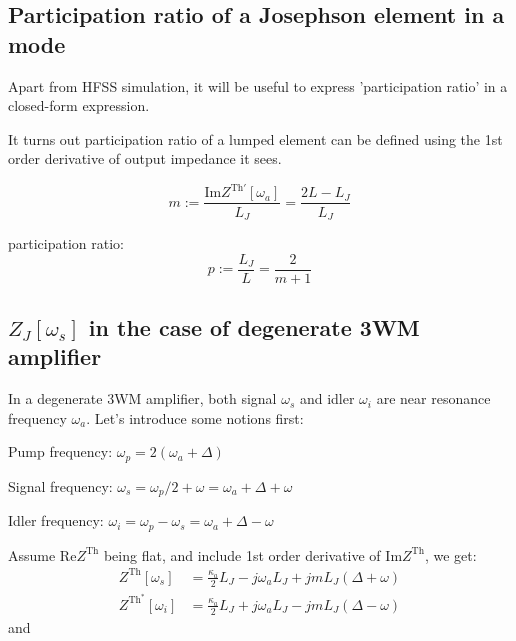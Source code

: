 \documentclass{article}
\renewcommand{\Re}{\mathrm{Re}}
\renewcommand{\Im}{\mathrm{Im}}
\newcommand{\Th}{\mathrm{Th}}
\begin{document}
\subsection{Participation ratio of a Josephson element in a mode}


Apart from HFSS simulation, it will be useful to express 'participation ratio' in a closed-form expression. 

It turns out participation ratio of a lumped element can be defined using the 1st order derivative of output impedance it sees. 

\begin{equation}\label{eq:m}
m:= \frac{\Im Z^{\Th'}[\omega_a]}{L_J} = \frac{2L - L_J}{L_J}
\end{equation}

participation ratio: 
\begin{equation}
p:= \frac{L_J}{L} = \frac{2}{m + 1}
\end{equation}


\subsection{$Z_J[\omega_s]$ in the case of degenerate 3WM amplifier}
In a degenerate 3WM amplifier, both signal $\omega_s$ and idler $\omega_i$ are near resonance frequency $\omega_a$. Let's introduce some notions first:

Pump frequency: $\omega_p = 2 (\omega_a + \Delta)$

Signal frequency: $\omega_s = \omega_p/2 + \omega = \omega_a + \Delta + \omega$

Idler frequency: $\omega_i = \omega_p - \omega_s = \omega_a + \Delta - \omega$

Assume $\Re{Z^\Th}$ being flat, and include 1st order derivative of $\Im{Z^\Th}$, we get:
\begin{equation}\label{eq:ZE}
\begin{aligned}
Z^\Th[\omega_s] &= \frac{\kappa_a}{2}L_J - j \omega_a L_J + j m L_J (\Delta + \omega) \\
Z^{\Th^*}[\omega_i] &= \frac{\kappa_a}{2}L_J + j \omega_a L_J - j m L_J (\Delta - \omega)
\end{aligned}
\end{equation}
and 
\end{document}
